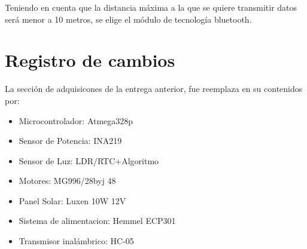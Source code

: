 \documentclass[a4paper,12pt]{article}
\begin{document}
Teniendo en cuenta que la distancia máxima a la que se quiere transmitir datos será menor a 10 metros, se elige el módulo de tecnología bluetooth.

\newpage
\section{Registro de cambios}
La sección de adquisicones de la entrega anterior, fue reemplaza en su contenidos por:
\begin{itemize}
\item Microcontrolador: Atmega328p
\item Sensor de Potencia: INA219
\item Sensor de Luz: LDR/RTC+Algoritmo
\item Motores: MG996/28byj 48
\item Panel Solar: Luxen 10W 12V
\item Sistema de alimentacion: Hemmel ECP301
\item Transmisor inalámbrico: HC-05
\end{itemize}
\end{document}
